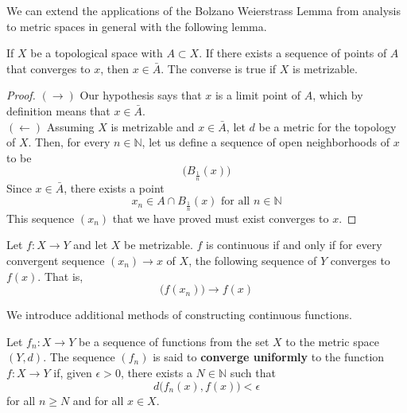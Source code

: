   We can extend the applications of the Bolzano Weierstrass Lemma from analysis to metric spaces in general with the following lemma. 

  \begin{lemma}
    If $X$ be a topological space with $A \subset X$. If there exists a sequence of points of $A$ that converges to $x$, then $x \in \bar{A}$. The converse is true if $X$ is metrizable. 
  \end{lemma}
  \begin{proof}
    $(\rightarrow)$ Our hypothesis says that $x$ is a limit point of $A$, which by definition means that $x \in \bar{A}$. \\
    $(\leftarrow)$ Assuming $X$ is metrizable and $x \in \bar{A}$, let $d$ be a metric for the topology of $X$. Then, for every $n \in \mathbb{N}$, let us define a sequence of open neighborhoods of $x$ to be
    \begin{equation}
      \big(B_{\frac{1}{n}} (x) \big)
    \end{equation}
    Since $x \in \bar{A}$, there exists a point 
    \begin{equation}
      x_n \in A \cap B_{\frac{1}{n}} (x) \text{ for all } n \in \mathbb{N}
    \end{equation}
    This sequence $(x_n)$ that we have proved must exist converges to $x$. 
  \end{proof}

  \begin{theorem}
    Let $f: X \longrightarrow Y$ and let $X$ be metrizable. $f$ is continuous if and only if for every convergent sequence $(x_n) \rightarrow x$ of $X$, the following sequence of $Y$ converges to $f(x)$. That is, 
    \begin{equation}
      \big( f(x_n) \big) \longrightarrow f(x)
    \end{equation}
  \end{theorem}

  We introduce additional methods of constructing continuous functions. 

  \begin{definition}
    Let $f_n: X \longrightarrow Y$ be a sequence of functions from the set $X$ to the metric space $(Y, d)$. The sequence $(f_n)$ is said to \textbf{converge uniformly} to the function $f: X \longrightarrow Y$ if, given $\epsilon > 0$, there exists a $N \in \mathbb{N}$ such that
    \begin{equation}
      d\big( f_n(x), f(x)\big) < \epsilon
    \end{equation}
    for all $n \geq N$ and for all $x \in X$. 
  \end{definition}

